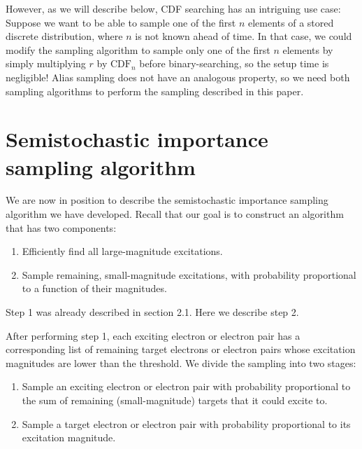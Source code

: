 \documentclass[english]{article}
\begin{document}
However, as we will describe below, CDF searching has an intriguing use case: Suppose we want to be able to sample one of the first $n$ elements of a stored discrete distribution, where $n$ is not known ahead of time. In that case, we could modify the sampling algorithm to sample only one of the first $n$ elements by simply multiplying $r$ by $\textrm{CDF}_n$ before binary-searching, so the setup time is negligible! Alias sampling does not have an analogous property, so we need both sampling algorithms to perform the sampling described in this paper.

\section{Semistochastic importance sampling algorithm}
We are now in position to describe the semistochastic importance sampling algorithm we have developed. Recall that our goal is to construct an algorithm that has two components:
\begin{enumerate}
	\item Efficiently find all large-magnitude excitations.
	\item Sample remaining, small-magnitude excitations, with probability proportional to a function of their magnitudes.
\end{enumerate}
Step 1 was already described in section 2.1. Here we describe step 2.

After performing step 1, each exciting electron or electron pair has a corresponding list of remaining target electrons or electron pairs whose excitation magnitudes are lower than the threshold. We divide the sampling into two stages:
\begin{enumerate}
	\item Sample an exciting electron or electron pair with probability proportional to the sum of remaining (small-magnitude) targets that it could excite to.
	\item Sample a target electron or electron pair with probability proportional to its excitation magnitude.
\end{enumerate}
\end{document}
